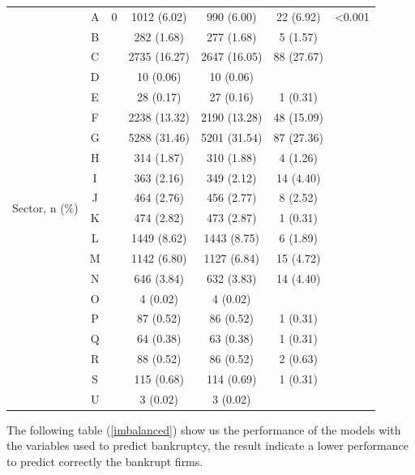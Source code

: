 \documentclass[journal]{IEEEtai}
\begin{document}
\begin{table}[h]
\begin{tabular*}{\textwidth}{@{}*{7}{c}}
\multirow[t]{20}{*}{Sector, n (\%)} & A & 0 & 1012 (6.02) & 990 (6.00) & 22 (6.92) & <0.001 \\
 & B &  & 282 (1.68) & 277 (1.68) & 5 (1.57) &  \\
 & C &  & 2735 (16.27) & 2647 (16.05) & 88 (27.67) &  \\
 & D &  & 10 (0.06) & 10 (0.06) &  &  \\
 & E &  & 28 (0.17) & 27 (0.16) & 1 (0.31) &  \\
 & F &  & 2238 (13.32) & 2190 (13.28) & 48 (15.09) &  \\
 & G &  & 5288 (31.46) & 5201 (31.54) & 87 (27.36) &  \\
 & H &  & 314 (1.87) & 310 (1.88) & 4 (1.26) &  \\
 & I &  & 363 (2.16) & 349 (2.12) & 14 (4.40) &  \\
 & J &  & 464 (2.76) & 456 (2.77) & 8 (2.52) &  \\
 & K &  & 474 (2.82) & 473 (2.87) & 1 (0.31) &  \\
 & L &  & 1449 (8.62) & 1443 (8.75) & 6 (1.89) &  \\
 & M &  & 1142 (6.80) & 1127 (6.84) & 15 (4.72) &  \\
 & N &  & 646 (3.84) & 632 (3.83) & 14 (4.40) &  \\
 & O &  & 4 (0.02) & 4 (0.02) &  &  \\
 & P &  & 87 (0.52) & 86 (0.52) & 1 (0.31) &  \\
 & Q &  & 64 (0.38) & 63 (0.38) & 1 (0.31) &  \\
 & R &  & 88 (0.52) & 86 (0.52) & 2 (0.63) &  \\
 & S &  & 115 (0.68) & 114 (0.69) & 1 (0.31) &  \\
 & U &  & 3 (0.02) & 3 (0.02) &  &  \\
\bottomrule
\end{tabular*}
\end{table}



The following table (\ref{imbalanced}) show us the performance of the models with the variables used to predict bankruptcy, the result indicate a lower performance to predict correctly the bankrupt firms.
\end{document}

